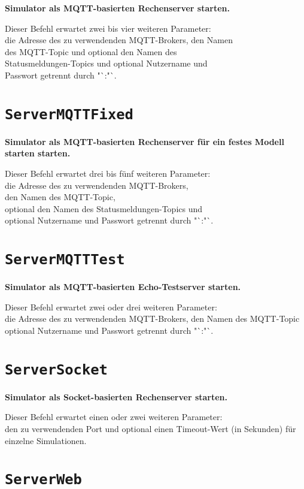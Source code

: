 \textbf{Simulator als MQTT-basierten Rechenserver starten.}

Dieser Befehl erwartet zwei bis vier weiteren Parameter:\\
die Adresse des zu verwendenden MQTT-Brokers, den Namen\\
des MQTT-Topic und optional den Namen des\\
Statusmeldungen-Topics und optional Nutzername und\\
Passwort getrennt durch "`:"`.

\section{\texttt{ServerMQTTFixed}}

\textbf{Simulator als MQTT-basierten Rechenserver für ein festes Modell starten starten.}

Dieser Befehl erwartet drei bis fünf weiteren Parameter:\\
die Adresse des zu verwendenden MQTT-Brokers,\\
den Namen des MQTT-Topic,\\
optional den Namen des Statusmeldungen-Topics und \\
optional Nutzername und Passwort getrennt durch "`:"`.

\section{\texttt{ServerMQTTTest}}

\textbf{Simulator als MQTT-basierten Echo-Testserver starten.}

Dieser Befehl erwartet zwei oder drei weiteren Parameter:\\
die Adresse des zu verwendenden MQTT-Brokers, den Namen des MQTT-Topic optional Nutzername und Passwort getrennt durch "`:"`.

\section{\texttt{ServerSocket}}

\textbf{Simulator als Socket-basierten Rechenserver starten.}

Dieser Befehl erwartet einen oder zwei weiteren Parameter:\\
den zu verwendenden Port und optional einen Timeout-Wert (in Sekunden) für einzelne Simulationen.

\section{\texttt{ServerWeb}}

